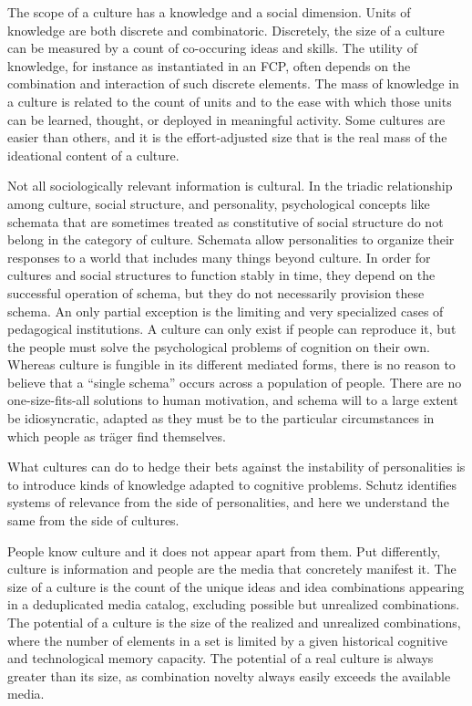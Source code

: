 \documentclass[]{book}
\theoremstyle{definition}
\theoremstyle{definition}
\theoremstyle{definition}
\theoremstyle{remark}
\begin{document}
The scope of a culture has a knowledge and a social dimension. Units of
knowledge are both discrete and combinatoric. Discretely, the size of a
culture can be measured by a count of co-occuring ideas and skills. The
utility of knowledge, for instance as instantiated in an FCP, often
depends on the combination and interaction of such discrete elements.
The mass of knowledge in a culture is related to the count of units and
to the ease with which those units can be learned, thought, or deployed
in meaningful activity. Some cultures are easier than others, and it is
the effort-adjusted size that is the real mass of the ideational content
of a culture.

Not all sociologically relevant information is cultural. In the triadic
relationship among culture, social structure, and personality,
psychological concepts like schemata that are sometimes treated as
constitutive of social structure do not belong in the category of
culture. Schemata allow personalities to organize their responses to a
world that includes many things beyond culture. In order for cultures
and social structures to function stably in time, they depend on the
successful operation of schema, but they do not necessarily provision
these schema. An only partial exception is the limiting and very
specialized cases of pedagogical institutions. A culture can only exist
if people can reproduce it, but the people must solve the psychological
problems of cognition on their own. Whereas culture is fungible in its
different mediated forms, there is no reason to believe that a ``single
schema'' occurs across a population of people. There are no
one-size-fits-all solutions to human motivation, and schema will to a
large extent be idiosyncratic, adapted as they must be to the particular
circumstances in which people as träger find themselves.

What cultures can do to hedge their bets against the instability of
personalities is to introduce kinds of knowledge adapted to cognitive
problems. Schutz identifies systems of relevance from the side of
personalities, and here we understand the same from the side of
cultures.

People know culture and it does not appear apart from them. Put
differently, culture is information and people are the media that
concretely manifest it. The size of a culture is the count of the unique
ideas and idea combinations appearing in a deduplicated media catalog,
excluding possible but unrealized combinations. The potential of a
culture is the size of the realized and unrealized combinations, where
the number of elements in a set is limited by a given historical
cognitive and technological memory capacity. The potential of a real
culture is always greater than its size, as combination novelty always
easily exceeds the available media.
\end{document}
